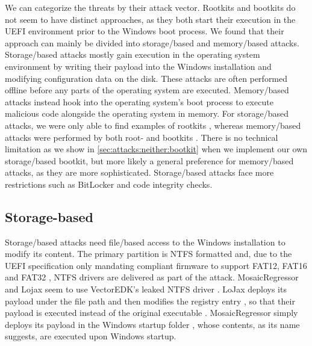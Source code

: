 We can categorize the threats by their attack vector.
Rootkits and bootkits do not seem to have distinct approaches, as they both start their execution in the \ac{UEFI} environment prior to the Windows boot process.
We found that their approach can mainly be divided into storage\-/based and memory\-/based attacks.
Storage\-/based attacks mostly gain execution in the operating system environment by writing their payload into the Windows installation and modifying configuration data on the disk.
These attacks are often performed offline before any parts of the operating system are executed.
Memory\-/based attacks instead hook into the operating system's boot process to execute malicious code alongside the operating system in memory.
For storage\-/based attacks, we were only able to find examples of rootkits \cite{vector-edk,mosaicregressor-technical-details,lojax}, whereas memory\-/based attacks were performed by both root- and bootkits \cite{dreamboot,efiguard,especter,finspy,moonbounce,cosmicstrand}.
There is no technical limitation as we show in \autoref{sec:attacks:neither:bootkit} when we implement our own storage\-/based bootkit, but more likely a general preference for memory\-/based attacks, as they are more sophisticated.
Storage\-/based attacks face more restrictions such as BitLocker and code integrity checks.

\subsection{Storage-based}

Storage\-/based attacks need file\-/based access to the Windows installation to modify its content.
The primary partition is \ac{NTFS} formatted and, due to the \ac{UEFI} specification only mandating compliant firmware to support \ac{FAT}12, \ac{FAT}16 and \ac{FAT}32 \cite[Section 13.3.1.1]{uefi-spec}, \ac{NTFS} drivers are delivered as part of the attack.
MosaicRegressor and Lojax seem to use VectorEDK's leaked \ac{NTFS} driver \cite{mosaicregressor-technical-details, lojax}.
LoJax deploys its payload under the file path  and then modifies the registry entry , so that their payload is executed instead of the original executable \cite{lojax}.
MosaicRegressor simply deploys its payload in the Windows startup folder \cite{mosaicregressor-technical-details}, whose contents, as its name suggests, are executed upon Windows startup.

